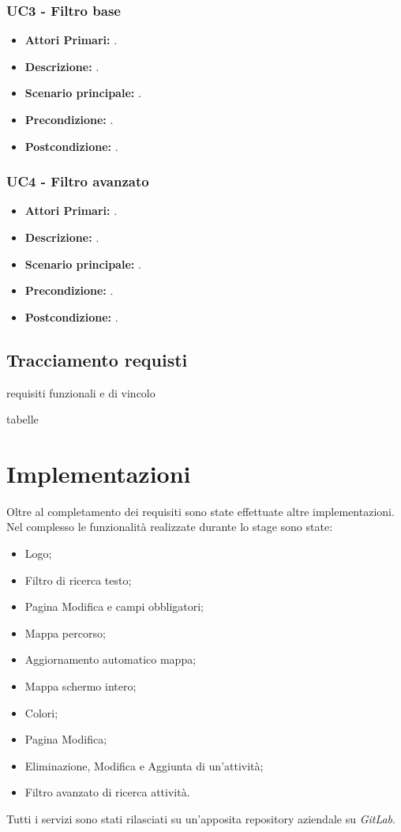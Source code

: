 \subsubsection{ UC3 - Filtro base}
\begin{itemize}
	\item\textbf{Attori Primari:} .
	\item\textbf{Descrizione:} .
	\item\textbf{Scenario principale:} .
	\item\textbf{Precondizione:} .
	\item\textbf{Postcondizione:} .
\end{itemize}

\subsubsection{ UC4 - Filtro avanzato}
\begin{itemize}
	\item\textbf{Attori Primari:} .
	\item\textbf{Descrizione:} .
	\item\textbf{Scenario principale:} .
	\item\textbf{Precondizione:} .
	\item\textbf{Postcondizione:} .
\end{itemize}

\newpage

\subsection{Tracciamento requisti}
requisiti funzionali e di vincolo

tabelle

\newpage

\section{Implementazioni}
Oltre al completamento dei requisiti sono state effettuate altre implementazioni.\\
Nel complesso le funzionalità realizzate durante lo stage sono state: 
\begin{itemize}
	\item Logo;
	\item Filtro di ricerca testo;
	\item Pagina Modifica e campi obbligatori;
	\item Mappa percorso;
	\item Aggiornamento automatico mappa;
	\item Mappa schermo intero;
	\item Colori;
	\item Pagina Modifica;
	\item Eliminazione, Modifica e Aggiunta di un'attività;
	\item Filtro avanzato di ricerca attività.
\end{itemize}
Tutti i servizi sono stati rilasciati su un'apposita repository aziendale su \textit{GitLab}.

